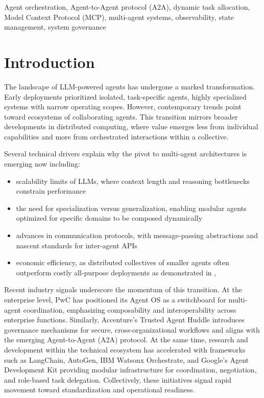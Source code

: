 \documentclass[conference]{IEEEtran}
\begin{document}
\begin{IEEEkeywords}
Agent orchestration, Agent-to-Agent protocol (A2A), dynamic task allocation, Model Context Protocol (MCP), multi-agent systems, observability, state management, system governance 
\end{IEEEkeywords}

\section{Introduction}
The landscape of LLM-powered agents has undergone a marked transformation. Early deployments prioritized isolated, task-specific agents, highly specialized systems with narrow operating scopes. However, contemporary trends point toward ecosystems of collaborating agents. This transition mirrors broader developments in distributed computing, where value emerges less from individual capabilities and more from orchestrated interactions within a collective. 

Several technical drivers explain why the pivot to multi-agent architectures is emerging now including: 
\begin{itemize}
\item scalability limits of LLMs, where context length and reasoning bottlenecks constrain performance
\item the need for specialization versus generalization, enabling modular agents optimized for specific domains to be composed dynamically
\item advances in communication protocols, with message-passing abstractions and nascent standards for inter-agent APIs
\item  economic efficiency, as distributed collectives of smaller agents often outperform costly all-purpose deployments as demonstrated in \cite{halo}, \cite{evolvingorch}
\end{itemize}

Recent industry signals underscore the momentum of this transition. At the enterprise level, PwC has positioned its Agent OS\cite{pwc25} as a switchboard for multi-agent coordination, emphasizing composability and interoperability across enterprise functions. Similarly, Accenture’s Trusted Agent Huddle\cite{accenture25} introduces governance mechanisms for secure, cross-organizational workflows and aligns with the emerging Agent-to-Agent (A2A) protocol. At the same time, research and development within the technical ecosystem has accelerated with frameworks such as LangChain, AutoGen, IBM Watsonx Orchestrate, and Google’s Agent Development Kit providing modular infrastructure for coordination, negotiation, and role-based task delegation. Collectively, these initiatives signal rapid movement toward standardization and operational readiness. 
\end{document}
